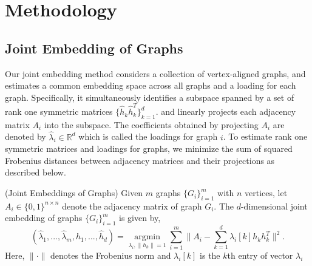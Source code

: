 \documentclass[10pt,journal,compsoc]{IEEEtran}
\newenvironment{definition}[1][Definition]{\begin{trivlist}
		\item[\hskip \labelsep {\bfseries #1}]}{\end{trivlist}}
\begin{document}
\section{Methodology}
\subsection{Joint Embedding of Graphs}
Our joint embedding method considers a collection of vertex-aligned graphs, and estimates a common embedding space across all graphs and a loading for each graph. Specifically, it simultaneously identifies a subspace spanned by a set of rank one symmetric matrices $\{\hat{h}_k \hat{h}_k^T\}_{k=1}^{d}$. and linearly projects each adjacency matrix $A_i$ into the subspace. The coefficients obtained by projecting $A_i$ are denoted by $\hat{\lambda}_i \in \mathbb{R}^d$ which is called the loadings for graph $i$. To estimate rank one symmetric matrices and loadings for graphs, we minimize the sum of squared Frobenius distances between adjacency matrices and their projections as described below.

\begin{definition} (Joint Embeddings of Graphs) Given $m$  graphs $\{G_i \} _{i=1}^{m}$ with $n$ vertices, let $A_i \in \{0,1\}^{n \times n }$ denote  the adjacency matrix of graph $G_i$. The $d$-dimensional joint embedding of graphs $\{G_i \} _{i=1}^{m}$ is given by,
\begin{equation}\label{eq:1}
 (\hat{\lambda}_1,...,\hat{\lambda}_m,\hat{h}_1,...,\hat{h}_d) = \underset{\lambda_i,\|h_k\|=1}{\operatorname{argmin}} \sum\limits_{i=1}^{m} \| A_i- \sum\limits_{k=1}^{d} \lambda_{i}[k] h_k h_k^T \|  ^2.  
\end{equation}
Here, $\| \cdot \|$ denotes the Frobenius norm and $\lambda_{i}[k]$ is the $k$th entry of vector $\lambda_i$
\end{definition}
\end{document}
